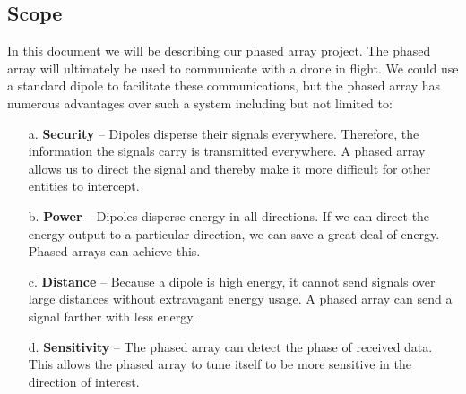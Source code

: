 \documentclass[ProductRequirements.tex]{subfiles}
\begin{document}
	\subsection{Scope}
	In this document we will be describing our phased array project. The phased array will ultimately be used to communicate with a drone in flight. We could use a standard dipole to facilitate these communications, but the phased array has numerous advantages over such a system including but not limited to:
	\begin{itemize} \itemsep1pt
		\item[a.]	\textbf{Security} -- Dipoles disperse their signals everywhere. Therefore, the information the signals carry is transmitted everywhere. A phased array allows us to direct the signal and thereby make it more difficult for other entities to intercept.
		\item[b.] 	\textbf{Power} -- Dipoles disperse energy in all directions. If we can direct the energy output to a particular direction, we can save a great deal of energy. Phased arrays can achieve this.
		\item[c.] 	\textbf{Distance} -- Because a dipole is high energy, it cannot send signals over large distances without extravagant energy usage. A phased array can send a signal farther with less energy.
			\item[d.] 	\textbf{Sensitivity} -- The phased array can detect the phase of received data. This allows the phased array to tune itself to be more sensitive in the direction of interest.
	\end{itemize}
\end{document}
